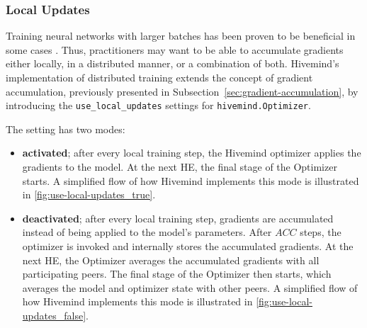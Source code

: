 \subsubsection{Local Updates}\label{ssec:local-updates}

Training neural networks with larger batches has been proven to be beneficial in some cases \cite{Krizhevsky2014owt, goyal2017accurate, you2017scaling}.
Thus, practitioners may want to be able to accumulate gradients either locally, in a distributed manner, or a combination of both.
Hivemind's implementation of distributed training extends the concept of gradient accumulation, previously presented in Subsection~\ref{sec:gradient-accumulation}, by introducing the \texttt{use\_local\_updates} settings for \texttt{hivemind.Optimizer}.

The setting has two modes:
\begin{itemize}
    \item \textbf{activated}; after every local training step, the Hivemind optimizer applies the gradients to the model.
          At the next HE, the final stage of the Optimizer starts.
          A simplified flow of how Hivemind implements this mode is illustrated in \autoref{fig:use-local-updates_true}.
    \item \textbf{deactivated}; after every local training step, gradients are accumulated instead of being applied to the model's parameters.
          After $ACC$ steps, the optimizer is invoked and internally stores the accumulated gradients.
          At the next HE, the Optimizer averages the accumulated gradients with all participating peers.
          The final stage of the Optimizer then starts, which averages the model and optimizer state with other peers.
          A simplified flow of how Hivemind implements this mode is illustrated in \autoref{fig:use-local-updates_false}.
\end{itemize}

